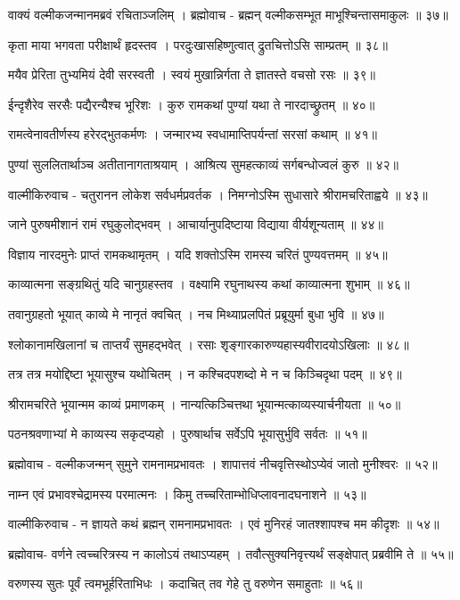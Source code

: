 वाक्यं वल्मीकजन्मानमब्रवं रचिताञ्जलिम् ।
ब्रह्मोवाच -
ब्रह्मन् वल्मीकसम्भूत माभूश्चिन्तासमाकुलः ॥ ३७॥

कृता माया भगवता परीक्षार्थं हृदस्तव ।
परदुःखासहिष्णुत्वात् द्रुतचित्तोऽसि साम्प्रतम् ॥ ३८॥

मयैव प्रेरिता तुभ्यमियं देवी सरस्वती ।
स्वयं मुखान्निर्गता ते ज्ञातस्ते वचसो रसः ॥ ३९॥

ईन्दृशैरेव सरसैः पद्यैरन्यैश्च भूरिशः ।
कुरु रामकथां पुण्यां यथा ते नारदाच्छ्रुतम् ॥ ४०॥

रामत्वेनावतीर्णस्य हरेरद्भुतकर्मणः ।
जन्मारभ्य स्वधामाप्तिपर्यन्तां सरसां कथाम् ॥ ४१॥

पुण्यां सुललितार्थाञ्च अतीतानागताश्रयाम् ।
आश्रित्य सुमहत्काव्यं सर्गबन्धोज्वलं कुरु ॥ ४२॥

वाल्मीकिरुवाच -
चतुरानन लोकेश सर्वधर्मप्रवर्तक ।
निमग्नोऽस्मि सुधासारे श्रीरामचरिताह्वये ॥ ४३॥

जाने पुरुषमीशानं रामं रघुकुलोद्भवम् ।
आचार्यानुपदिष्टाया विद्याया वीर्यशून्यताम् ॥ ४४॥

विज्ञाय नारदमुनेः प्राप्तं रामकथामृतम् ।
यदि शक्तोऽस्मि रामस्य चरितं पुण्यवत्तमम् ॥ ४५॥

काव्यात्मना सङ्ग्रथितुं यदि चानुग्रहस्तव ।
वक्ष्यामि रघुनाथस्य कथां काव्यात्मना शुभाम् ॥ ४६॥

तवानुग्रहतो भूयात् काव्ये मे नानृतं क्वचित् ।
नच मिथ्याप्रलपितं प्रब्रूयुर्मा बुधा भुवि ॥ ४७॥

श्लोकानामखिलानां च ताप्तर्यं सुमहद्भवेत् ।
रसाः श‍ृङ्गारकारुण्यहास्यवीरादयोऽखिलाः ॥ ४८॥

तत्र तत्र मयोद्दिष्टा भूयासुश्च यथोचितम् ।
न कश्चिदपशब्दो मे न च किञ्चिदृथा पदम् ॥ ४९॥

श्रीरामचरिते भूयान्मम काव्यं प्रमाणकम् ।
नान्यत्किञ्चित्तथा भूयान्मत्काव्यस्यार्चनीयता ॥ ५०॥

पठनश्रवणाभ्यां मे काव्यस्य सकृदप्यहो ।
पुरुषार्थाच सर्वेऽपि भूयासुर्भुवि सर्वतः ॥ ५१॥

ब्रह्मोवाच -
वल्मीकजन्मन् सुमुने रामनामप्रभावतः ।
शापात्तवं नीचवृत्तिस्थोऽप्येवं जातो मुनीश्वरः ॥ ५२॥

नाम्न एवं प्रभावश्चेद्रामस्य परमात्मनः ।
किमु तच्चरिताम्भोधिप्लावनादघनाशने ॥ ५३॥

वाल्मीकिरुवाच -
न ज्ञायते कथं ब्रह्मन् रामनामप्रभावतः ।
एवं मुनिरहं जातश्शापश्च मम कीदृशः ॥ ५४॥

ब्रह्मोवाच-
वर्णने त्वच्चरित्रस्य न कालोऽयं तथाऽप्यहम् ।
तवौत्सुक्यनिवृत्त्यर्थं सङ्क्षेपात् प्रब्रवीमि ते ॥ ५५॥

वरुणस्य सुतः पूर्वं त्वमभूर्हरिताभिधः ।
कदाचित् तव गेहे तु वरुणेन समाहुताः ॥ ५६॥

